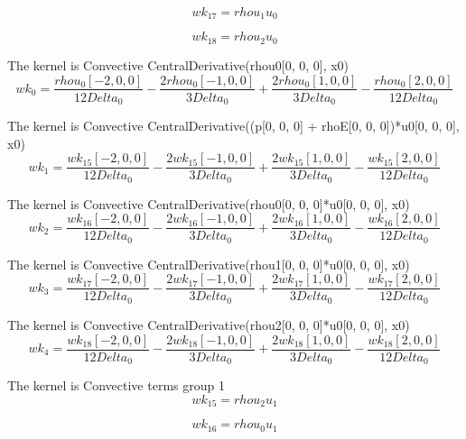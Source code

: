 \documentclass{article}
\begin{document}
\begin{dmath}{wk_{17}} = {rhou_{1}} {u_{0}}\end{dmath}

\begin{dmath}{wk_{18}} = {rhou_{2}} {u_{0}}\end{dmath}

The kernel is Convective CentralDerivative(rhou0[0, 0, 0], x0) \begin{dmath}{wk_{0}} = \frac{{rhou_{0}}[{-2,0,0}]}{12 Delta_0} - 
\frac{2 {rhou_{0}}[{-1,0,0}]}{3 Delta_0} + \frac{2 
{rhou_{0}}[{1,0,0}]}{3 Delta_0} - \frac{{rhou_{0}}[{2,0,0}]}{12 
Delta_0}\end{dmath}

The kernel is Convective CentralDerivative((p[0, 0, 0] + rhoE[0, 0, 0])*u0[0, 0, 0], x0) \begin{dmath}{wk_{1}} = \frac{{wk_{15}}[{-2,0,0}]}{12 Delta_0} - 
\frac{2 {wk_{15}}[{-1,0,0}]}{3 Delta_0} + \frac{2 
{wk_{15}}[{1,0,0}]}{3 Delta_0} - \frac{{wk_{15}}[{2,0,0}]}{12 
Delta_0}\end{dmath}

The kernel is Convective CentralDerivative(rhou0[0, 0, 0]*u0[0, 0, 0], x0) \begin{dmath}{wk_{2}} = \frac{{wk_{16}}[{-2,0,0}]}{12 Delta_0} - 
\frac{2 {wk_{16}}[{-1,0,0}]}{3 Delta_0} + \frac{2 
{wk_{16}}[{1,0,0}]}{3 Delta_0} - \frac{{wk_{16}}[{2,0,0}]}{12 
Delta_0}\end{dmath}

The kernel is Convective CentralDerivative(rhou1[0, 0, 0]*u0[0, 0, 0], x0) \begin{dmath}{wk_{3}} = \frac{{wk_{17}}[{-2,0,0}]}{12 Delta_0} - 
\frac{2 {wk_{17}}[{-1,0,0}]}{3 Delta_0} + \frac{2 
{wk_{17}}[{1,0,0}]}{3 Delta_0} - \frac{{wk_{17}}[{2,0,0}]}{12 
Delta_0}\end{dmath}

The kernel is Convective CentralDerivative(rhou2[0, 0, 0]*u0[0, 0, 0], x0) \begin{dmath}{wk_{4}} = \frac{{wk_{18}}[{-2,0,0}]}{12 Delta_0} - 
\frac{2 {wk_{18}}[{-1,0,0}]}{3 Delta_0} + \frac{2 
{wk_{18}}[{1,0,0}]}{3 Delta_0} - \frac{{wk_{18}}[{2,0,0}]}{12 
Delta_0}\end{dmath}

The kernel is Convective terms group 1\begin{dmath}{wk_{15}} = {rhou_{2}} {u_{1}}\end{dmath}

\begin{dmath}{wk_{16}} = {rhou_{0}} {u_{1}}\end{dmath}
\end{document}
